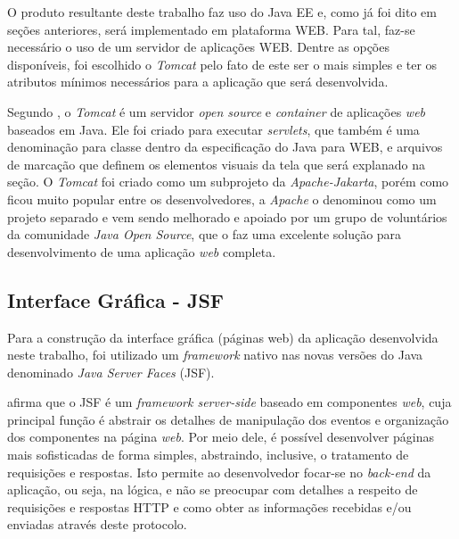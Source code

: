 \par O produto resultante deste trabalho faz uso do Java EE e, como já foi dito
em seções anteriores, será implementado em plataforma WEB. Para tal, faz-se
necessário o uso de um servidor de aplicações WEB. Dentre as opções disponíveis, foi escolhido o \textit{Tomcat} pelo fato de este ser o mais simples e ter os atributos mínimos necessários para a aplicação que
será desenvolvida.

\par Segundo , o \textit{Tomcat} é um
servidor \textit{open source} e \textit{container} de aplicações \textit{web}
baseados em Java. Ele foi criado para executar \textit{servlets}, que também é
uma denominação para classe dentro da especificação do Java para WEB, e arquivos
de marcação que definem os elementos visuais da tela que será explanado na seção.
O \textit{Tomcat} foi criado como um subprojeto da \textit{Apache-Jakarta}, porém como ficou
muito popular entre os desenvolvedores, a \textit{Apache} o denominou como um
projeto separado e vem sendo melhorado e apoiado por um grupo de voluntários da comunidade \textit{Java Open Source}, que o faz 
uma excelente solução para desenvolvimento de uma aplicação \textit{web} completa. 

 

\subsection{Interface Gráfica - JSF}


\par Para a construção da interface gráfica (páginas web) da aplicação
desenvolvida neste trabalho, foi utilizado um \textit{framework} nativo nas
novas versões do Java denominado \textit{Java Server Faces} (JSF).

\par {} afirma que o JSF é um
\textit{framework server-side} baseado em componentes \textit{web}, cuja principal função é abstrair os detalhes de manipulação dos eventos e organização dos componentes na página \textit{web}. 
Por meio dele, é possível desenvolver páginas mais sofisticadas de forma
simples, abstraindo, inclusive, o tratamento de requisições e respostas. Isto permite ao desenvolvedor focar-se no \textit{back-end} da aplicação, ou seja, na lógica, e não se preocupar com detalhes a respeito de requisições e respostas HTTP e como obter as informações recebidas e/ou enviadas através deste protocolo.

